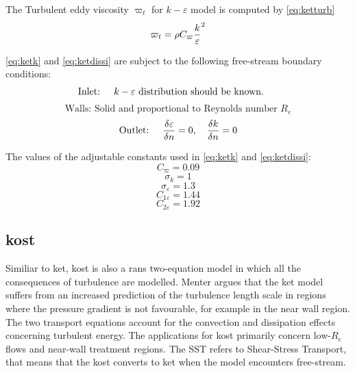 \documentclass[english]{kththesis}
\begin{document}
The Turbulent eddy viscosity $\varpi_t$ for $k-\varepsilon$ model is computed by \ref{eq:ketturb}
\begin{equation}
\label{eq:ketturb}{\varpi_t} = \rho {C_\varpi}{{k \over \varepsilon }^2}\end{equation}

\ref{eq:ketk} and \ref{eq:ketdissi} are subject to the following free-stream boundary conditions:
\begin{equation}\text{Inlet: \quad}k-\varepsilon \text{  distribution should be known. \quad}\end{equation}
\begin{equation}\text{Walls:    Solid and proportional to Reynolds number }R_e\end{equation}
\begin{equation}\text{Outlet: \quad}{{\delta \varepsilon } \over {\delta n}} = 0, \quad {{\delta k} \over {\delta n}} = 0\end{equation}

The values of the adjustable constants used in \ref{eq:ketk} and \ref{eq:ketdissi}:
\begin{equation}{C_\varpi } = 0.09\end{equation}
\begin{equation}{\sigma _k} = 1\end{equation}
\begin{equation}{\sigma _\varepsilon } = 1.3\end{equation}
\begin{equation}{C_{1\varepsilon }} = 1.44\end{equation}
\begin{equation}{C_{2\varepsilon }} = 1.92\end{equation}

\subsection{\acrfull{kost}}
Similiar to \acrshort{ket}, \acrshort{kost} is also a \acrfull{rans} two-equation model in which all the consequences of turbulence are modelled. Menter \cite{Menter1992} argues that the \acrshort{ket} model suffers from an increased prediction of the turbulence length scale in regions where the pressure gradient is not favourable, for example in the near wall region. The two transport equations account for the convection and dissipation effects concerning turbulent energy. The applications for \acrshort{kost} primarily concern low-$R_e$ flows and near-wall treatment regions. The SST refers to Shear-Stress Transport, that means that the \acrshort{kost} converts to \acrshort{ket} when the model encounters free-stream.
\end{document}
